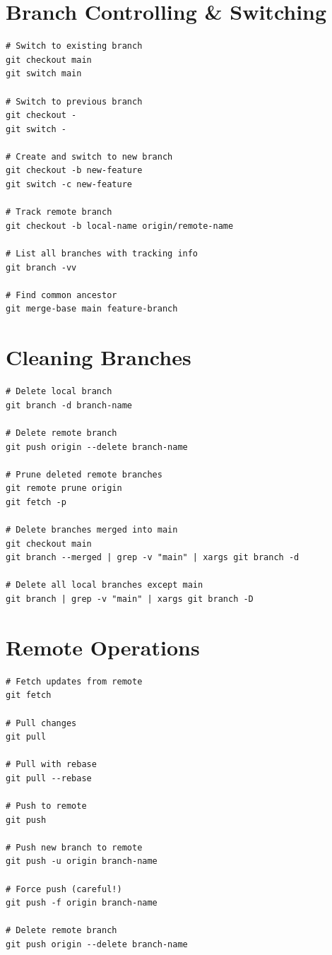 \documentclass[12pt,a4paper]{article}
\begin{document}
\section{Branch Controlling \& Switching}
\begin{lstlisting}[style=bash]
# Switch to existing branch
git checkout main
git switch main

# Switch to previous branch
git checkout -
git switch -

# Create and switch to new branch
git checkout -b new-feature
git switch -c new-feature

# Track remote branch
git checkout -b local-name origin/remote-name

# List all branches with tracking info
git branch -vv

# Find common ancestor
git merge-base main feature-branch
\end{lstlisting}

\section{Cleaning Branches}
\begin{lstlisting}[style=bash]
# Delete local branch
git branch -d branch-name

# Delete remote branch
git push origin --delete branch-name

# Prune deleted remote branches
git remote prune origin
git fetch -p

# Delete branches merged into main
git checkout main
git branch --merged | grep -v "main" | xargs git branch -d

# Delete all local branches except main
git branch | grep -v "main" | xargs git branch -D
\end{lstlisting}

\section{Remote Operations}
\begin{lstlisting}[style=bash]
# Fetch updates from remote
git fetch

# Pull changes
git pull

# Pull with rebase
git pull --rebase

# Push to remote
git push

# Push new branch to remote
git push -u origin branch-name

# Force push (careful!)
git push -f origin branch-name

# Delete remote branch
git push origin --delete branch-name
\end{lstlisting}
\end{document}
